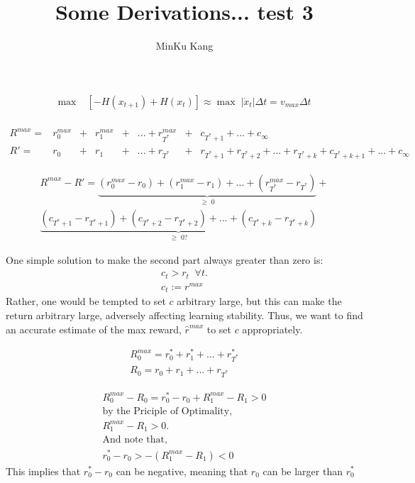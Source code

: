 \documentclass[12pt]{article}
\begin{document}
 
  
\title{Some Derivations... test  3}

\author{MinKu Kang}
 
\maketitle

\begin{align}
\max \; &\left[ - H(x_{t+1}) + H(x_{t}) \right] \approx 
\max \; | \dot{x}_t  | \Delta t = v_{max} \Delta t \\
\end{align}

\begin{align*}
R^{max} = &r_0^{max} &+ &r_1^{max} &+& ...  + r_{T^*}^{max} &+ &c_{T^{*}+1} + ... + c_{\infty} \\
R' = &r_0 &+ &r_1 &+& ... + r_{T^*} &+ &r_{T^{*}+1} + r_{T^{*}+2} + ... + r_{T^{*}+k} + c_{T^{*}+k+1} + ... + c_{\infty}  
\end{align*}

\begin{align*}
R^{max} - R' = \underbrace{(r_0^{max} - r_0) + (r_1^{max} - r_1) + ... + (r_{T^*}^{max} - r_{T^*})}_{\geq \; 0} + \\
\underbrace{(c_{T^{*}+1} - r_{T^{*}+1}) + (c_{T^{*}+2} - r_{T^{*}+2}) + ... + (c_{T^{*}+k} - r_{T^{*}+k})}_{\geq \; 0 ? }
\end{align*}

One simple solution to make the second part always greater than zero is:
\begin{align*}
c_t > r_t \;\; \forall t. \\
c_t := r^{max}
\end{align*}
Rather, one would be tempted to set $c$ arbitrary large, but this can make the return arbitrary large, adversely affecting learning stability. Thus, we want to find an accurate estimate of the max reward, $\hat{r}^{max}$ to set $c$ appropriately.

\begin{align*}
R_0^{max} = r_0^* + r_1^* + ... + r_{T^*}^* \\
R_0 = r_0 + r_1 + ... + r_{T^*}
\end{align*}

\begin{align*}
R_0^{max} - R_0 = r_0^* - r_0 + R_1^{max} - R_1 > 0 \\
\text{by the Priciple of Optimality,} \\
R_1^{max} - R_1 > 0. \\
\text{And note that,} \\
r_0^* - r_0 > - (R_1^{max} - R_1) < 0 
\end{align*}
This implies that $r_0^* - r_0$ can be negative, meaning that $r_0$ can be larger than $r_0^*$ 
\end{document}
